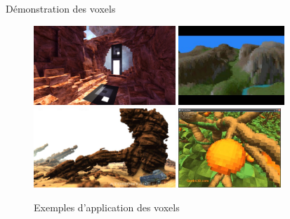 \documentclass{beamer}
\begin{document}
\begin{frame}{Démonstration des voxels}
  \begin{center}
    \begin{figure}
      \includegraphics[height=3cm]{Images/Images_Alexis/voxel_engine3.jpg}
      \includegraphics[height=3cm]{Images/Images_Alexis/voxel_engine1.jpg} \\
      \includegraphics[height=3cm]{Images/Images_Alexis/voxel_engine4.jpg}
      \includegraphics[height=3cm]{Images/Images_Alexis/voxel_engine2.jpg}
      \caption{Exemples d'application des voxels}
    \end{figure}
  \end{center}
\end{frame}
\end{document}
